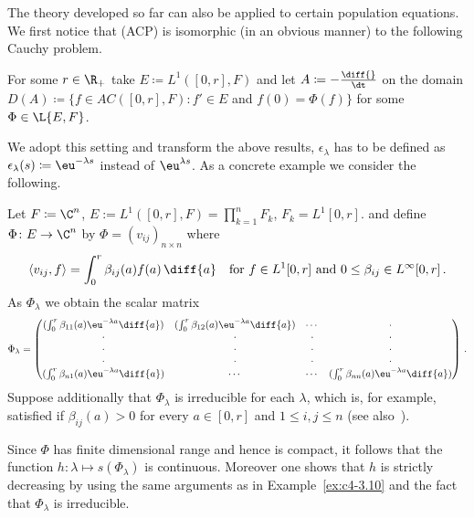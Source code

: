 The theory developed so far can also be applied to certain population equations.
We first notice that (ACP) is isomorphic (in an obvious manner) to the following Cauchy problem.

For some $r \in \R_{+}$ take $E \coloneqq L^{1}([0,r], F)$ and let $A \coloneqq - \frac{\diff{}}{\dt}$ on the domain $D(A) \coloneqq \{f \in AC([0,r], F) \colon f' \in E$ and $f(0) = \Phi(f)\}$ for some $\Phi \in \L{E,F}$.

We adopt this setting and transform the above results, \eg $\epsilon_{\lambda}$ has to be defined as $\epsilon_{\lambda}(s) \coloneqq \eu^{-\lambda s}$ instead of\/ $\eu^{\lambda s}$.
As a concrete example we consider the following.



\begin{example}\label{ex:c4-3.12}
%
%
Let $F \coloneqq \C^{n}$, $E:= L^{1}([0,r],F) = \prod_{k=1}^{n} F_{k}$, $F_{k} = L^{1}[0,r]$. and define $\Phi \colon E \to \C^{n}$ by $\Phi = (v_{ij})_{{n\times n}}$ where
\[
\langle v_{ij}, f \rangle = \int_{0}^{r} \beta_{ij}(a)f(a) \, \diff{a} \quad \text{for } f \in L^{1}[0,r] \text{ and } 0 \leq \beta_{ij} \in L^{\infty}[0,r] \,.
\]
As $\Phi_{\lambda}$ we obtain the scalar matrix
\begin{equation*}\label{eq:c4-3.12-kgk2}
\Phi_{\lambda} = \begin{pmatrix}
(\int_0^r \beta_{11}(a)\eu^{-\lambda a}\diff{a}) & (\int_0^r \beta_{12}(a)\eu^{-\lambda a}\diff{a}) & \cdots & \cdot \\
\cdot & \cdot & \cdot & \cdot \\
\cdot & \cdot & \cdot & \cdot \\
\cdot & \cdot & \cdot & \cdot \\
(\int_0^r \beta_{n1}(a)\eu^{-\lambda a}\diff{a}) & \cdots & \cdots & (\int_0^r \beta_{nn}(a)\eu^{-\lambda a}\diff{a})
\end{pmatrix}\,. 
\end{equation*}
Suppose additionally that $\Phi_{\lambda}$ is irreducible for each $\lambda$, which is, for example, satisfied if\/ $\beta_{ij}(a) > 0$ for every $a \in [0,r]$ and $1 \leq i,j \leq n$ (see also \textcite[p.257ff]{bellmancooke:1963}\,).

Since $\Phi$ has finite dimensional range and hence is compact, it follows that the function $h \colon \lambda \mapsto s(\Phi_{\lambda})$ is continuous.
Moreover one shows that $h$ is strictly decreasing by using the same arguments as in Example~\ref{ex:c4-3.10} and the fact that $\Phi_{\lambda}$ is irreducible.


\end{example}
